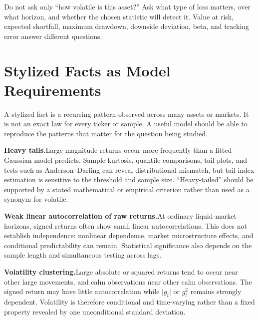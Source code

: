 \documentclass[11pt]{article}
\begin{document}
Do not ask only ``how volatile is this asset?'' Ask what type of loss matters, over what horizon, and whether the chosen statistic will detect it. Value at risk, expected shortfall, maximum drawdown, downside deviation, beta, and tracking error answer different questions.

\section{Stylized Facts as Model Requirements}

A stylized fact is a recurring pattern observed across many assets or markets. It is not an exact law for every ticker or sample. A useful model should be able to reproduce the patterns that matter for the question being studied.

\textbf{Heavy tails.}\enspace Large-magnitude returns occur more frequently than a fitted Gaussian model predicts. Sample kurtosis, quantile comparisons, tail plots, and tests such as Anderson--Darling can reveal distributional mismatch, but tail-index estimation is sensitive to the threshold and sample size. ``Heavy-tailed'' should be supported by a stated mathematical or empirical criterion rather than used as a synonym for volatile.

\textbf{Weak linear autocorrelation of raw returns.}\enspace At ordinary liquid-market horizons, signed returns often show small linear autocorrelations. This does not establish independence: nonlinear dependence, market microstructure effects, and conditional predictability can remain. Statistical significance also depends on the sample length and simultaneous testing across lags.

\textbf{Volatility clustering.}\enspace Large absolute or squared returns tend to occur near other large movements, and calm observations near other calm observations. The signed return may have little autocorrelation while $\lvert g_t\rvert$ or $g_t^2$ remains strongly dependent. Volatility is therefore conditional and time-varying rather than a fixed property revealed by one unconditional standard deviation.
\end{document}
